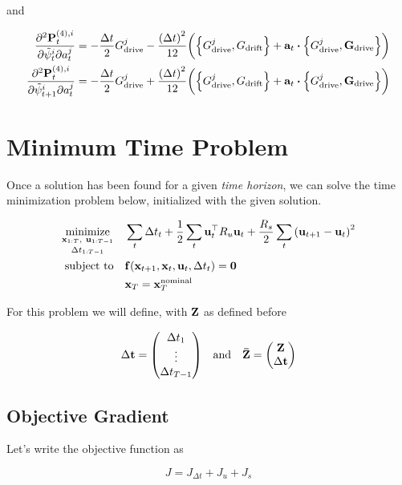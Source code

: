 \documentclass{article}
\newcommand{\isopsi}{\tilde \psi}
\begin{document}
and 

\begin{align}
  \pdv{\vb{P}_t^{(4), i}}{\isopsi_t^i}{a^j_t} &= -\frac{\Delta t}{2} G^j_{\text{drive}} - \frac{\qty(\Delta t)^2}{12}\bigg( \qty{G^j_{\text{drive}}, G_{\text{drift}}} + \vb{a}_t \vdot \qty{G^j_{\text{drive}}, \vb{G}_{\text{drive}}} \bigg)\\
  \pdv{\vb{P}_t^{(4), i}}{\isopsi_{t+1}^i}{a^j_t} &= -\frac{\Delta t}{2} G^j_{\text{drive}} + \frac{\qty(\Delta t)^2}{12}\bigg( \qty{G^j_{\text{drive}}, G_{\text{drift}}} + \vb{a}_t \vdot \qty{G^j_{\text{drive}}, \vb{G}_{\text{drive}}} \bigg)
\end{align}

\section{Minimum Time Problem}

Once a solution has been found for a given \textit{time horizon}, we can solve the time minimization problem below, initialized with the given solution.

\begin{align*}
  \underset{\Delta t_{1:T-1}}{\underset{\vb{x}_{1:T}, \ \vb{u}_{1:T-1}}{\text{minimize}}} & 
  \quad \sum_t \Delta t_t + \frac{1}{2} \sum_t \vb{u}_t^\top R_u \vb{u}_t + \frac{R_s}{2} \sum_t \qty(\vb{u}_{t+1} - \vb{u}_t)^2\\
  \text{subject to} & \quad \vb{f}(\vb{x}_{t+1}, \vb{x}_t, \vb{u}_t, \Delta t_t) = \vb{0}\\
  & \quad \vb{x}_T = \vb{x}^\text{nominal}_T
\end{align*}

For this problem we will define, with $\vb{Z}$ as defined before 

$$
  \Delta \vb{t} = \mqty(
    \Delta t_1 \\ 
    \vdots \\ 
    \Delta t_{T-1}
  )
  \quad \text{and} \quad
  \vb{\bar Z} = \mqty(\vb{Z} \\ \Delta \vb{t})
$$


\subsection{Objective Gradient}

Let's write the objective function as 

\begin{equation}
  J = J_{\Delta t} + J_u + J_s
\end{equation}
\end{document}
